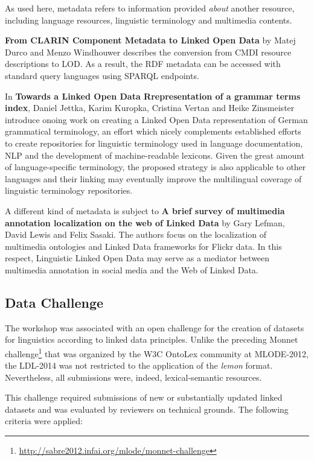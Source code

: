 	As used here, metadata refers to information provided \emph{about} another resource, including language resources, linguistic terminology and multimedia contents.
	
	\textbf{From CLARIN Component Metadata to Linked Open Data} by 
	Matej Durco and Menzo Windhouwer describes the conversion from CMDI resource descriptions to LOD. 
	As a result, the RDF metadata can be accessed with standard query languages using SPARQL endpoints. 

	In \textbf{Towards a Linked Open Data Rrepresentation of a grammar terms index},
	Daniel Jettka, Karim Kuropka, Cristina Vertan and Heike Zinsmeister introduce onoing work on creating a Linked Open Data 
	representation of German grammatical terminology, an effort which nicely complements established efforts to create repositories for linguistic terminology used in language documentation, NLP and the development of machine-readable lexicons. Given the great amount of language-specific terminology, the proposed strategy is also applicable to other languages and their linking may eventually improve the multilingual coverage of linguistic terminology repositories.

	A different kind of metadata is subject to \textbf{A brief survey of multimedia annotation localization on the web of Linked Data} by 
	Gary Lefman, David Lewis and Felix Sasaki. The authors focus on the localization of multimedia ontologies and Linked Data frameworks for Flickr data. 
	In this respect, Linguistic Linked Open Data may serve as a mediator between multimedia annotation in social media and the Web of Linked Data. 

\subsection{Data Challenge}

The workshop was associated with an open challenge for the creation of datasets for linguistics according to linked data principles.
Unlike the preceding Monnet challenge\footnote{
	\url{http://sabre2012.infai.org/mlode/monnet-challenge}
} 
that was organized by the W3C OntoLex community at MLODE-2012, the LDL-2014 was not restricted to the application of the \emph{lemon} format. 
Nevertheless, all submissions were, indeed, lexical-semantic resources.
 
This challenge required submissions of new or substantially updated linked datasets and was evaluated by reviewers on technical grounds. 
The following criteria were applied: 


